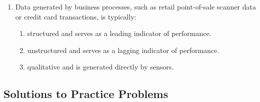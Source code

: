 \begin{enumerate}
	\item Data generated by business processes, such as retail point-of-sale scanner data or credit card transactions, is typically:
	      \begin{enumerate}[label=\Alph*.]
		      \item structured and serves as a leading indicator of performance.
		      \item unstructured and serves as a lagging indicator of performance.
		      \item qualitative and is generated directly by sensors.
	      \end{enumerate}
\end{enumerate}

\subsection{Solutions to Practice Problems}
\label{subsec:app_Solutions_M11}

